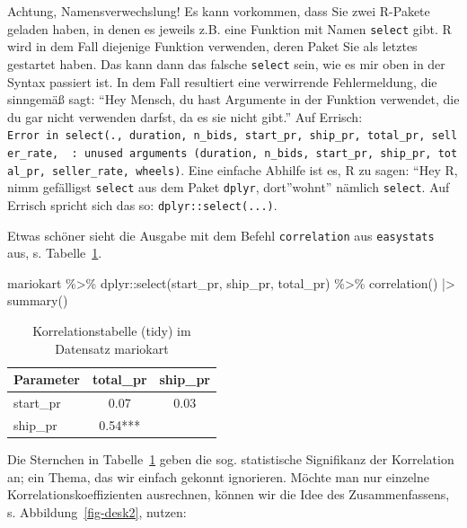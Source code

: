 \documentclass[
  letterpaper,
  twoside,
  open=any]{scrbook}
\newenvironment{Shaded}{\begin{snugshade}}{\end{snugshade}}
\newcommand{\FunctionTok}[1]{\textcolor[rgb]{0.28,0.35,0.67}{#1}}
\newcommand{\NormalTok}[1]{\textcolor[rgb]{0.00,0.23,0.31}{#1}}
\newcommand{\SpecialCharTok}[1]{\textcolor[rgb]{0.37,0.37,0.37}{#1}}
\theoremstyle{definition}
\theoremstyle{definition}
\theoremstyle{definition}
\theoremstyle{remark}
\begin{document}
Achtung, Namensverwechslung! Es kann vorkommen, dass Sie zwei R-Pakete
geladen haben, in denen es jeweils z.B. eine Funktion mit Namen
\texttt{select} gibt. R wird in dem Fall diejenige Funktion verwenden,
deren Paket Sie als letztes gestartet haben. Das kann dann das falsche
\texttt{select} sein, wie es mir oben in der Syntax passiert ist. In dem
Fall resultiert eine verwirrende Fehlermeldung, die sinngemäß sagt:
\enquote{Hey Mensch, du hast Argumente in der Funktion verwendet, die du
gar nicht verwenden darfst, da es sie nicht gibt.} Auf Errisch:
\texttt{Error\ in\ select(.,\ duration,\ n\_bids,\ start\_pr,\ ship\_pr,\ total\_pr,\ seller\_rate,\ \ :\ unused\ arguments\ (duration,\ n\_bids,\ start\_pr,\ ship\_pr,\ total\_pr,\ seller\_rate,\ wheels)}.
Eine einfache Abhilfe ist es, R zu sagen: \enquote{Hey R, nimm
gefälligst \texttt{select} aus dem Paket \texttt{dplyr}, dort}wohnt''
nämlich \texttt{select}. Auf Errisch spricht sich das so:
\texttt{dplyr::select(...)}.

Etwas schöner sieht die Ausgabe mit dem Befehl \texttt{correlation} aus
\texttt{easystats} aus, s. Tabelle~\ref{tbl-mario-corr-pdf}.

\begin{Shaded}
\begin{Highlighting}[]
\NormalTok{mariokart }\SpecialCharTok{\%\textgreater{}\%} 
\NormalTok{  dplyr}\SpecialCharTok{::}\FunctionTok{select}\NormalTok{(start\_pr, ship\_pr, total\_pr) }\SpecialCharTok{\%\textgreater{}\%} 
  \FunctionTok{correlation}\NormalTok{() }\SpecialCharTok{|\textgreater{}} 
  \FunctionTok{summary}\NormalTok{() }
\end{Highlighting}
\end{Shaded}

\begin{longtable}[]{@{}lcc@{}}

\caption{\label{tbl-mario-corr-pdf}Korrelationstabelle (tidy) im
Datensatz mariokart}

\tabularnewline

\toprule\noalign{}
Parameter & total\_pr & ship\_pr \\
\midrule\noalign{}
\endhead
\bottomrule\noalign{}
\endlastfoot
start\_pr & 0.07 & 0.03 \\
ship\_pr & 0.54*** & \\

\end{longtable}

Die Sternchen in Tabelle~\ref{tbl-mario-corr-pdf} geben die sog.
statistische Signifikanz der Korrelation an; ein Thema, das wir einfach
gekonnt ignorieren. Möchte man nur einzelne Korrelationskoeffizienten
ausrechnen, können wir die Idee des Zusammenfassens, s.
Abbildung~\ref{fig-desk2}, nutzen:
\end{document}
